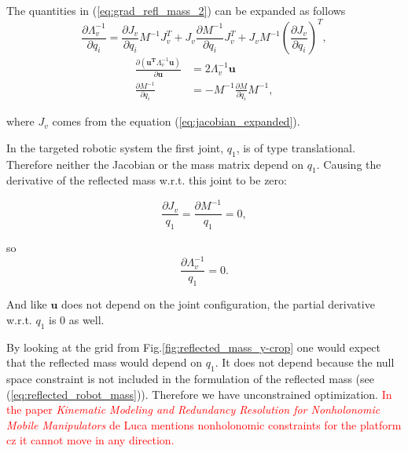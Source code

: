 The quantities in (\ref{eq:grad_refl_mass_2}) can be expanded as follows
\begin{equation}
\frac{\partial {\Lambda_{v}^{-1}}}{\partial {q_i}} = \frac{\partial {J_v}}{\partial {q_i}} M^{-1} J_v^T + J_v \frac{\partial {M^{-1}}}{\partial {q_i}} J_v^T + J_v M^{-1} \left ( \frac{\partial {J_v}}{\partial {q_i}} \right )^T  ,
\end{equation}
\begin{align}
	\frac{\partial {(\mathbf{u^T} \Lambda_{v}^{-1} \mathbf{u})}}{\partial {\mathbf{u}}}& = 2 \Lambda_{v}^{-1} \mathbf{u} \\
	\frac{\partial {M^{-1}}}{\partial {q_i}} & = -M^{-1} 
	\frac{\partial {M}}{\partial {q_i}} M^{-1},
\end{align}


where $J_v$ comes from the equation (\ref{eq:jacobian_expanded}).

In the targeted robotic system the first joint, $q_1$, is of type translational. Therefore neither  the Jacobian or the mass matrix depend on $q_1$. Causing the derivative of the reflected mass w.r.t. this joint to be zero:


\begin{equation}
\frac{\partial {{J_v}}}{q_1} = \frac{\partial {{M^{-1}}}}{q_1} = 0,
\label{eq:j_m_no__q1}
\end{equation}


so 
\begin{equation}
\frac{\partial {{\Lambda_{v}^{-1}}}}{q_1} = 0.
\end{equation}

And like $\mathbf{u}$ does not depend on the joint configuration, the partial derivative w.r.t. $q_1$ is $0$ as well.

By looking at the grid from Fig.\ref{fig:reflected_mass_y-crop} one would expect that the reflected mass would depend on $q_1$. It does not depend because the null space constraint is not included in the formulation of the reflected mass (see  (\ref{eq:reflected_robot_mass})). Therefore we have  unconstrained optimization.  \textcolor{red}{In the paper \textit{Kinematic Modeling and Redundancy Resolution
		for Nonholonomic Mobile Manipulators} de Luca  mentions nonholonomic constraints for the platform cz it cannot move in any direction. }



